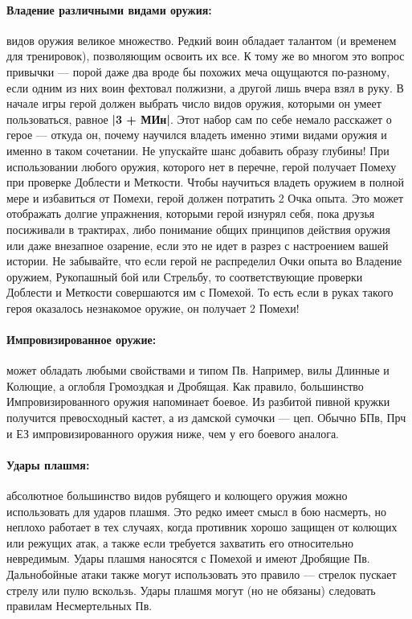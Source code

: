 \paragraph{Владение различными видами оружия:} видов оружия великое множество. Редкий воин обладает талантом (и временем для тренировок), позволяющим освоить их все. К тому же во многом это вопрос привычки — порой даже два вроде бы похожих меча ощущаются по-разному, если одним из них воин фехтовал полжизни, а другой лишь вчера взял в руку.
\newline
В начале игры герой должен выбрать число видов оружия, которыми он умеет пользоваться, равное \textbf{|3 + МИн|}. Этот набор сам по себе немало расскажет о герое — откуда он, почему научился владеть именно этими видами оружия и именно в таком сочетании. Не упускайте шанс добавить образу глубины! При использовании любого оружия, которого нет в перечне, герой получает Помеху при проверке Доблести и Меткости. Чтобы научиться владеть оружием в полной мере и избавиться от Помехи, герой должен потратить 2 Очка опыта. Это может отображать долгие упражнения, которыми герой изнурял себя, пока друзья посиживали в трактирах, либо понимание общих принципов действия оружия или даже внезапное озарение, если это не идет в разрез с настроением вашей истории.
\newline
Не забывайте, что если герой не распределил Очки опыта во Владение оружием, Рукопашный бой или Стрельбу, то соответствующие проверки Доблести и Меткости совершаются им с Помехой. То есть если в руках такого героя оказалось незнакомое оружие, он получает 2 Помехи!
\paragraph{Импровизированное оружие:} может обладать любыми свойствами и типом Пв. Например, вилы Длинные и Колющие, а оглобля Громоздкая и Дробящая. Как правило, большинство Импровизированного оружия напоминает боевое. Из разбитой пивной кружки получится превосходный кастет, а из дамской сумочки — цеп. Обычно БПв, Прч и ЕЗ импровизированного оружия
ниже, чем у его боевого аналога.
\paragraph{Удары плашмя:} абсолютное большинство видов рубящего и колющего оружия можно использовать для ударов плашмя. Это редко имеет смысл в бою насмерть, но неплохо работает в тех случаях, когда противник хорошо защищен от колющих или режущих атак, а также если требуется захватить его относительно невредимым. Удары плашмя наносятся с Помехой и имеют Дробящие Пв. Дальнобойные атаки также могут использовать это правило — стрелок пускает стрелу или пулю вскользь. Удары плашмя могут (но не обязаны) следовать правилам Несмертельных Пв.
